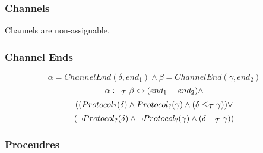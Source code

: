 \documentclass[]{article}
\begin{document}
\subsubsection{Channels}

Channels are non-assignable.

\subsubsection{Channel Ends}

\[
\alpha = ChannelEnd(\delta, end_1) \wedge \beta = ChannelEnd(\gamma, end_2)
\]
\[
\alpha :=_{\cal T} \beta \Leftrightarrow (end_1 = end_2) \wedge
\]
\[
 ((Protocol_?(\delta) \wedge Protocol_?(\gamma) \wedge (\delta \leq_{\cal T} \gamma)) \vee
\]
\[
(\neg{}Protocol_?(\delta) \wedge \neg{}Protocol_?(\gamma) \wedge (\delta =_{\cal T} \gamma))
\]


\subsubsection{Proceudres}
\end{document}
